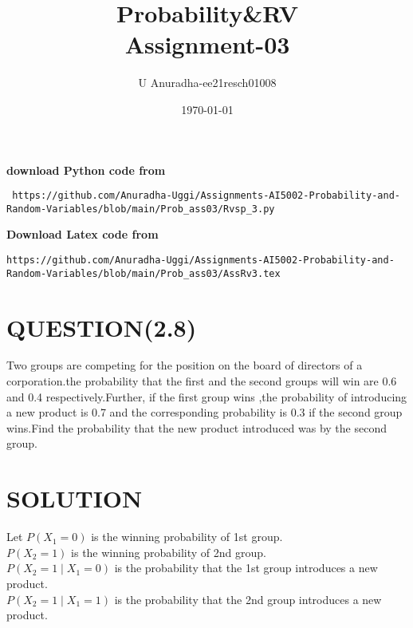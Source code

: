 \documentclass[journal,12pt,twocolumn]{IEEEtran}
\title{Probability\&RV \\ Assignment-03}
\author{U Anuradha-ee21resch01008}
\date{\today}
\begin{document}
\maketitle
\newpage
\bigskip
\renewcommand{\thefigure}{\theenumi}
\renewcommand{\thetable}{\theenumi}
\textbf{download Python code from}
\begin{lstlisting}
 https://github.com/Anuradha-Uggi/Assignments-AI5002-Probability-and-Random-Variables/blob/main/Prob_ass03/Rvsp_3.py
\end{lstlisting}
\textbf{Download Latex code from}
\begin{lstlisting}
https://github.com/Anuradha-Uggi/Assignments-AI5002-Probability-and-Random-Variables/blob/main/Prob_ass03/AssRv3.tex
\end{lstlisting}
\section{QUESTION(2.8)}
Two groups are competing for the position on the board of directors of a corporation.the probability that the first and the second groups will win are 0.6 and 0.4 respectively.Further, if the first group wins ,the probability of introducing a new product is 0.7 and the corresponding probability is 0.3 if the second group wins.Find the probability that the new product introduced was by the second group.
\section{SOLUTION}
Let $P(X_1=0)$ is the winning probability of 1st group.\\
    $P(X_2=1)$ is the winning probability of 2nd group.\\
    $P(X_2=1\mid X_1=0)$ is the probability that the 1st group introduces a new product.\\
    $P(X_2=1\mid X_1=1)$ is the probability that the 2nd group introduces a new product.\\ 
    
\end{document}
